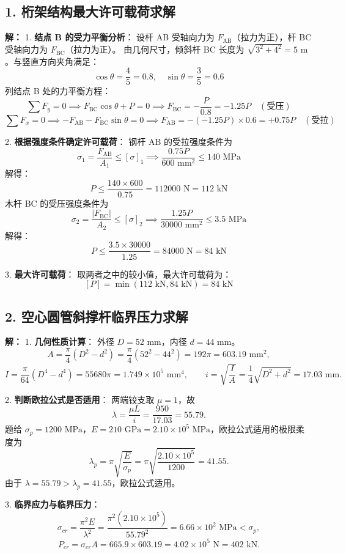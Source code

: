 \documentclass[11pt,a4paper]{ctexrep}
\begin{document}
{\subsection*{1. 桁架结构最大许可载荷求解}
\textbf{解：}
1. \textbf{结点 B 的受力平衡分析}：
设杆 AB 受轴向力为 $F_{\mathrm{AB}}$（拉力为正），杆 BC 受轴向力为 $F_{\mathrm{BC}}$（拉力为正）。
由几何尺寸，倾斜杆 BC 长度为 $\sqrt{3^2 + 4^2} = 5\text{ m}$。与竖直方向夹角满足：
\[
\cos\theta = \frac{4}{5} = 0.8, \quad \sin\theta = \frac{3}{5} = 0.6
\]
列结点 B 处的力平衡方程：
\[
\sum F_y = 0 \implies F_{\mathrm{BC}} \cos\theta + P = 0 \implies F_{\mathrm{BC}} = -\frac{P}{0.8} = -1.25 P \quad (\text{受压})
\]
\[
\sum F_x = 0 \implies -F_{\mathrm{AB}} - F_{\mathrm{BC}} \sin\theta = 0 \implies F_{\mathrm{AB}} = -(-1.25P) \times 0.6 = +0.75 P \quad (\text{受拉})
\]

2. \textbf{根据强度条件确定许可载荷}：
钢杆 AB 的受拉强度条件为
  \[
  \sigma_1 = \frac{F_{\mathrm{AB}}}{A_1} \le [\sigma]_1 \implies \frac{0.75 P}{600\text{ mm}^2} \le 140\text{ MPa}
  \]
  解得：
  \[
  P \le \frac{140 \times 600}{0.75} = 112000\text{ N} = 112\text{ kN}
  \]
木杆 BC 的受压强度条件为
  \[
  \sigma_2 = \frac{|F_{\mathrm{BC}}|}{A_2} \le [\sigma]_2 \implies \frac{1.25 P}{30000\text{ mm}^2} \le 3.5\text{ MPa}
  \]
  解得：
  \[
  P \le \frac{3.5 \times 30000}{1.25} = 84000\text{ N} = 84\text{ kN}
  \]

3. \textbf{最大许可载荷}：
取两者之中的较小值，最大许可载荷为：
\[
[P] = \min(112\text{ kN}, 84\text{ kN}) = 84\text{ kN}
\]

\subsection*{2. 空心圆管斜撑杆临界压力求解}
\textbf{解：}
1. \textbf{几何性质计算}：
外径 $D = 52\text{ mm}$，内径 $d = 44\text{ mm}$。
\[
A=\frac{\pi}{4}(D^2-d^2)=\frac{\pi}{4}(52^2-44^2)=192\pi=603.19\text{ mm}^2,
\]
\[
I=\frac{\pi}{64}(D^4-d^4)=55680\pi=1.749\times10^5\text{ mm}^4,\qquad
i=\sqrt{\frac IA}=\frac14\sqrt{D^2+d^2}=17.03\text{ mm}.
\]

2. \textbf{判断欧拉公式是否适用}：
两端铰支取 $\mu=1$，故
\[
\lambda=\frac{\mu L}{i}=\frac{950}{17.03}=55.79.
\]
题给 $\sigma_p=1200\text{ MPa}$，$E=210\text{ GPa}=2.10\times10^5\text{ MPa}$，欧拉公式适用的极限柔度为
\[
\lambda_p=\pi\sqrt{\frac{E}{\sigma_p}}
=\pi\sqrt{\frac{2.10\times10^5}{1200}}
=41.55.
\]
由于 $\lambda=55.79>\lambda_p=41.55$，欧拉公式适用。

3. \textbf{临界应力与临界压力}：
\[
\sigma_{cr}=\frac{\pi^2E}{\lambda^2}
=\frac{\pi^2(2.10\times10^5)}{55.79^2}
=6.66\times10^2\text{ MPa}<\sigma_p,
\]
\[
P_{cr}=\sigma_{cr}A
=665.9\times603.19
=4.02\times10^5\text{ N}
=402\text{ kN}.
\]

}
\end{document}
